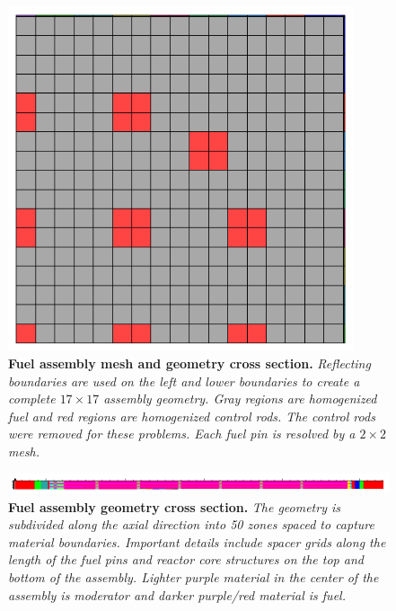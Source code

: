\begin{figure}[t!]
  \begin{center}
    \includegraphics[width=4in]{chapters/spn_equations/problem3_radial_mat.png}
  \end{center}
  \caption{\textbf{Fuel assembly mesh and geometry cross section.}
    \textit{Reflecting boundaries are used on the left and lower
      boundaries to create a complete $17 \times 17$ assembly
      geometry. Gray regions are homogenized fuel and red regions are
      homogenized control rods. The control rods were removed for
      these problems. Each fuel pin is resolved by a $2 \times 2$
      mesh.}}
  \label{fig:problem3_radial_mat}
\end{figure}
\begin{figure}[t!]
  \begin{center}
    \includegraphics[width=6.0in]{chapters/spn_equations/problem3_axial_mat.png}
  \end{center}
  \caption{\textbf{Fuel assembly geometry cross section.} \textit{The
      geometry is subdivided along the axial direction into 50 zones
      spaced to capture material boundaries. Important details include
      spacer grids along the length of the fuel pins and reactor core
      structures on the top and bottom of the assembly. Lighter purple
      material in the center of the assembly is moderator and darker
      purple/red material is fuel.}}
  \label{fig:problem3_axial_mat}
\end{figure}
